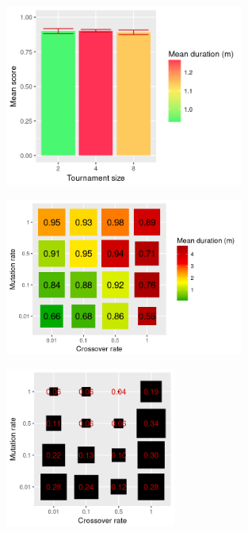 \begin{figure}
    \centering
    \includegraphics[width=0.7\textwidth]{figures/ge-tournament-sampling}
    \caption{}
\end{figure}

\begin{figure}
    \centering
    \includegraphics[width=0.7\textwidth]{figures/ge-recombination-sampling}
    \caption{}
\end{figure}

\begin{figure}
    \centering
    \includegraphics[width=0.5\textwidth]{figures/ge-recombination-sampling-variance}
    \caption{}
\end{figure}

